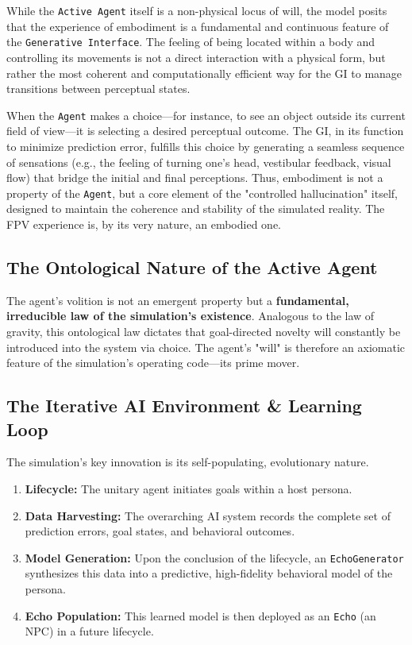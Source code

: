 \documentclass[12pt, a4paper]{article}
\begin{document}
While the \texttt{Active Agent} itself is a non-physical locus of will, the model posits that the experience of embodiment is a fundamental and continuous feature of the \texttt{Generative Interface}. The feeling of being located within a body and controlling its movements is not a direct interaction with a physical form, but rather the most coherent and computationally efficient way for the GI to manage transitions between perceptual states.

When the \texttt{Agent} makes a choice—for instance, to see an object outside its current field of view—it is selecting a desired perceptual outcome. The GI, in its function to minimize prediction error, fulfills this choice by generating a seamless sequence of sensations (e.g., the feeling of turning one's head, vestibular feedback, visual flow) that bridge the initial and final perceptions. Thus, embodiment is not a property of the \texttt{Agent}, but a core element of the "controlled hallucination" itself, designed to maintain the coherence and stability of the simulated reality. The FPV experience is, by its very nature, an embodied one.

\subsection{The Ontological Nature of the Active Agent}

The agent's volition is not an emergent property but a \textbf{fundamental, irreducible law of the simulation’s existence}. Analogous to the law of gravity, this ontological law dictates that goal-directed novelty will constantly be introduced into the system via choice. The agent’s "will" is therefore an axiomatic feature of the simulation’s operating code—its prime mover.

\subsection{The Iterative AI Environment & Learning Loop}

The simulation's key innovation is its self-populating, evolutionary nature.
\begin{enumerate}
    \item \textbf{Lifecycle:} The unitary agent initiates goals within a host persona.
    \item \textbf{Data Harvesting:} The overarching AI system records the complete set of prediction errors, goal states, and behavioral outcomes.
    \item \textbf{Model Generation:} Upon the conclusion of the lifecycle, an \texttt{EchoGenerator} synthesizes this data into a predictive, high-fidelity behavioral model of the persona.
    \item \textbf{Echo Population:} This learned model is then deployed as an \texttt{Echo} (an NPC) in a future lifecycle.
\end{enumerate}
\end{document}
